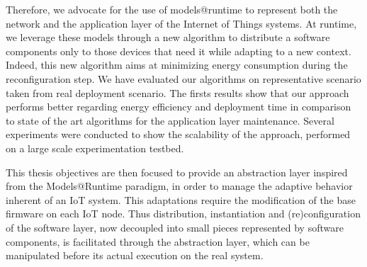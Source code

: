 Therefore, we advocate for the use of models@runtime to represent both the network and the application layer of the Internet of Things systems.
At runtime, we leverage these models through a new algorithm to distribute a software components only to those devices that need it while adapting to a new context.
Indeed, this new algorithm aims at minimizing energy consumption during the reconfiguration step.
We have evaluated our algorithms on representative scenario taken from real deployment scenario.
The firsts results show that our approach performs better regarding energy efficiency and deployment time in comparison to state of the art algorithms for the application layer maintenance.
Several experiments were conducted to show the scalability of the approach, performed on a large scale experimentation testbed.

This thesis objectives are then focused to provide an abstraction layer inspired from the Models@Runtime paradigm, in order to manage the adaptive behavior inherent of an IoT system.
This adaptations require the modification of the base firmware on each IoT node.
Thus distribution, instantiation and (re)configuration of the software layer, now decoupled into small pieces represented by software components, is facilitated through the abstraction layer, which can be manipulated before its actual execution on the real system.